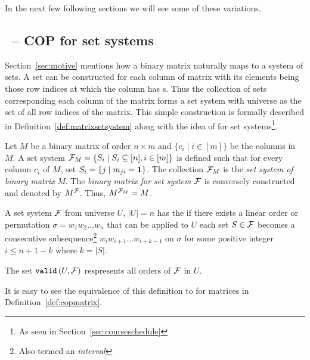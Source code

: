 In the next few following sections we will see some of these
variations.




\subsection{\PQRtree\ --  COP for set systems}
\label{sec:surveycertalgo}

Section~\ref{sec:motive} mentions how a binary matrix naturally maps
to a system of sets.  A set can be constructed for each column of
matrix with its elements being those row indices at which the column
has \un s. Thus the collection of sets corresponding each column of
the matrix forms a set system with universe as the set of all row
indices of the matrix.  This simple construction is formally described
in Definition~\ref{def:matrixsetsystem} along with the idea of \cop
for set systems\footnote{As seen in Section~\ref{sec:courseschedule}}.

\begin{definition}%
  \label{def:matrixsetsystem}%
  Let $M$ be a binary matrix of order $n \times m$ and $\{c_i \mid i
  \in [m]\}$ be the columns in $M$.  A set system ${\cal F}_{M} = \{S_i
  \mid S_i \subseteq [n], i \in [m]\}$ is defined such that for every
  column $c_i$ of $M$, set $S_i = \{j \mid m_{ji} = \textbf{1} \}$. The
  collection ${\cal F}_M$ is the {\em set system of binary matrix} $M$. The
  {\em binary matrix for set system} ${\cal F}$ is conversely constructed
  and denoted by $M^{\cal F}$. Thus, $M^{{\cal F}_M} = M$.%
  \par\noindent%
  A set system ${\cal F}$ from universe $U$, $|U| = n$ has the {\em \cop}
  if there exists a linear order or permutation $\sigma = w_1w_2\ldots
  w_n$ that can be applied to $U$ \stt each set $S \in {\cal F}$ becomes a
  consecutive subsequence\footnote{Also termed an {\em interval}}
  $w_{i}w_{i+1}\ldots w_{i+k-1}$ on $\sigma$ for some positive integer
  $i \le n+1-k$ where $k = |S|$.
  \par\noindent%
  The set ${\tt valid}\left(U,{\cal F}\right)$ respresents all \COP orders of ${\cal F}$ in $U$.
  \dstop
\end{definition}

It is easy to see the equivalence of this definition to \COP for
matrices in Definition~\ref{def:copmatrix}.

